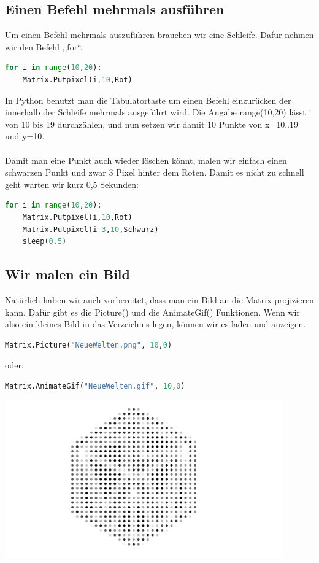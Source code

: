 \subsection{\large{Einen Befehl mehrmals ausführen}}
Um einen Befehl mehrmals auszuführen brauchen wir eine Schleife. Dafür nehmen wir den Befehl ,,for``.
\begin{lstlisting}[language=Python, caption=For Schleifen]
for i in range(10,20):
	Matrix.Putpixel(i,10,Rot)
\end{lstlisting}
In Python benutzt man die Tabulatortaste um einen Befehl einzurücken der innerhalb der Schleife mehrmals ausgeführt wird. Die Angabe range(10,20) lässt i von 10 bis 19 durchzählen, und nun setzen wir damit 10 Punkte von x=10..19 und y=10. \\
\ \\
Damit man eine Punkt auch wieder löschen könnt, malen wir einfach einen schwarzen Punkt und zwar 3 Pixel hinter dem Roten. Damit es nicht zu schnell geht warten wir kurz 0,5 Sekunden:
\begin{lstlisting}[language=Python, caption=For Schleifen]
for i in range(10,20):
	Matrix.Putpixel(i,10,Rot)
	Matrix.Putpixel(i-3,10,Schwarz)
	sleep(0.5)
\end{lstlisting}

\subsection{\large{Wir malen ein Bild}}
Natürlich haben wir auch vorbereitet, dass man ein Bild an die Matrix projizieren kann. Dafür gibt es die Picture() und die AnimateGif() Funktionen. Wenn wir also ein kleines Bild in das Verzeichnis legen, können wir es laden und anzeigen.
\begin{lstlisting}[language=Python, caption=Ein Bild]
Matrix.Picture("NeueWelten.png", 10,0)
\end{lstlisting}
oder:
\begin{lstlisting}[language=Python, caption=Ein Animiertes Gif]
Matrix.AnimateGif("NeueWelten.gif", 10,0)
\end{lstlisting}
\begin{minipage}[t]{\textwidth}
  \centering
  \includegraphics[width=0.9\textwidth]{pictures/NW.png}
  \label{img:NW}
\end{minipage}
